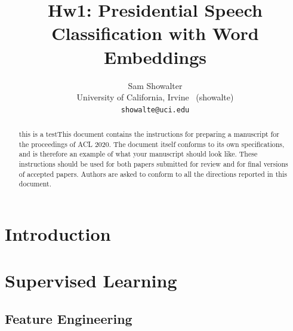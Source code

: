 \documentclass[11pt,a4paper]{article}
\title{Hw1: Presidential Speech Classification with Word Embeddings}
\author{Sam Showalter \\
  University of California, Irvine \ (showalte) \\  
\texttt{showalte@uci.edu}}
\date{}
\begin{document}
\maketitle
\begin{abstract}
this is a testThis document contains the instructions for preparing a manuscript for the proceedings of ACL 2020.
The document itself conforms to its own specifications, and is therefore an example of what your manuscript should look like.
These instructions should be used for both papers submitted for review and for final versions of accepted papers.
Authors are asked to conform to all the directions reported in this document.
\end{abstract}


\section{Introduction}










\section{Supervised Learning}%
\label{sec:supervised_learning}




\subsection{Feature Engineering}%
\label{sub:feature_engineering}
\end{document}
